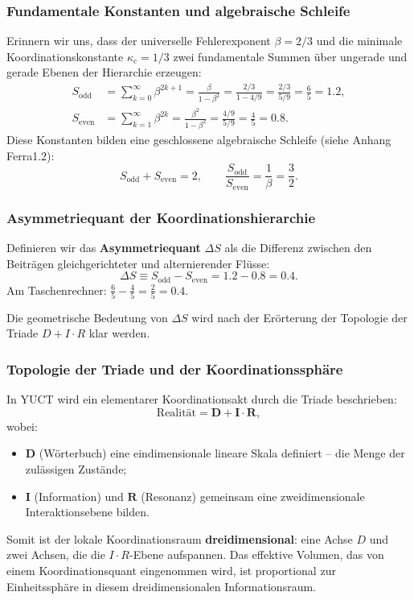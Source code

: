 \documentclass[12pt,a4paper]{article}
\begin{document}
	\subsubsection{Fundamentale Konstanten und algebraische Schleife}
	
	Erinnern wir uns, dass der universelle Fehlerexponent \(\beta = 2/3\) und die minimale Koordinationskonstante \(\kappa_c = 1/3\) zwei fundamentale Summen über ungerade und gerade Ebenen der Hierarchie erzeugen:
	\begin{align}
		S_{\mathrm{odd}} &= \sum_{k=0}^{\infty} \beta^{2k+1} = \frac{\beta}{1-\beta^2} = \frac{2/3}{1-4/9} = \frac{2/3}{5/9} = \frac{6}{5} = 1.2, \label{eq:Sodd_again}\\
		S_{\mathrm{even}} &= \sum_{k=1}^{\infty} \beta^{2k} = \frac{\beta^2}{1-\beta^2} = \frac{4/9}{5/9} = \frac{4}{5} = 0.8. \label{eq:Seven_again}
	\end{align}
	Diese Konstanten bilden eine geschlossene algebraische Schleife (siehe Anhang Ferra1.2):
	\[
	S_{\mathrm{odd}} + S_{\mathrm{even}} = 2, \qquad \frac{S_{\mathrm{odd}}}{S_{\mathrm{even}}} = \frac{1}{\beta} = \frac{3}{2}.
	\]
	
	\subsubsection{Asymmetriequant der Koordinationshierarchie}
	
	Definieren wir das \textbf{Asymmetriequant} \(\Delta S\) als die Differenz zwischen den Beiträgen gleichgerichteter und alternierender Flüsse:
	\[
	\Delta S \equiv S_{\mathrm{odd}} - S_{\mathrm{even}} = 1.2 - 0.8 = 0.4.
	\]
	Am Taschenrechner: \(\frac{6}{5} - \frac{4}{5} = \frac{2}{5} = 0.4.\)
	
	Die geometrische Bedeutung von \(\Delta S\) wird nach der Erörterung der Topologie der Triade \(D+I\cdot R\) klar werden.
	
	\subsubsection{Topologie der Triade und der Koordinationssphäre}
	
	In YUCT wird ein elementarer Koordinationsakt durch die Triade beschrieben:
	\[
	\text{Realität} = \mathbf{D} + \mathbf{I}\cdot\mathbf{R},
	\]
	wobei:
	\begin{itemize}
		\item \(\mathbf{D}\) (Wörterbuch) eine eindimensionale lineare Skala definiert -- die Menge der zulässigen Zustände;
		\item \(\mathbf{I}\) (Information) und \(\mathbf{R}\) (Resonanz) gemeinsam eine zweidimensionale Interaktionsebene bilden.
	\end{itemize}
	Somit ist der lokale Koordinationsraum \textbf{dreidimensional}: eine Achse \(D\) und zwei Achsen, die die \(I\cdot R\)-Ebene aufspannen. Das effektive Volumen, das von einem Koordinationsquant eingenommen wird, ist proportional zur Einheitssphäre in diesem dreidimensionalen Informationsraum.
	
\end{document}
